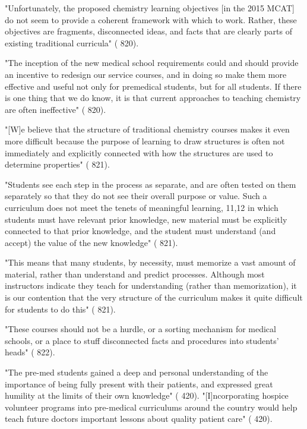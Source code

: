 "Unfortunately, the proposed chemistry learning objectives [in the 2015 MCAT] do not seem to provide a coherent framework with which to work. Rather, these objectives are fragments, disconnected ideas, and facts that are clearly parts of existing traditional curricula" (\cite{Cooper-2013} 820).

"The inception of the new medical school requirements could and should provide an incentive to redesign our service courses, and in doing so make them more effective and usefulnot only for premedical students, but for all students. If there is one thing that we do know, it is that current approaches to teaching chemistry are often ineffective" (\cite{Cooper-2013} 820).

"[W]e believe that the structure of traditional chemistry courses makes it even more difficult because the purpose of learning to draw structures is often not immediately and explicitly connected with how the structures are used to determine properties" (\cite{Cooper-2013} 821).

"Students see each step in the process as separate, and are often tested on them separately so that they do not see their overall purpose or value. Such a curriculum does not meet the tenets of meaningful learning, 11,12 in which students must have relevant prior knowledge, new material must be explicitly connected to that prior knowledge, and the student must understand (and accept) the value of the new knowledge" (\cite{Cooper-2013} 821).

"This means that many students, by necessity, must memorize a vast amount of material, rather than understand and predict processes. Although most instructors indicate they teach for understanding (rather than memorization), it is our contention that the very structure of the curriculum makes it quite difficult for students to do this" (\cite{Cooper-2013} 821).

"These courses should not be a hurdle, or a sorting mechanism for medical schools, or a place to stuff disconnected facts and procedures into students’ heads" (\cite{Cooper-2013} 822).


"The pre-med students gained a deep and personal understanding of the importance of being fully present with their patients, and expressed great humility at the limits of their own knowledge" (\cite{Doering-2015} 420).
"[I]ncorporating hospice volunteer programs into pre-medical curriculums around the country would help teach future doctors important lessons about quality patient care" (\cite{Doering-2015} 420).


